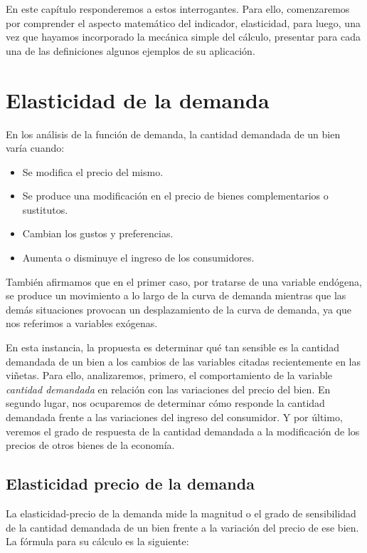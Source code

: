 \documentclass[12pt,a4paper]{article}
\begin{document}
En este capítulo responderemos a estos interrogantes. Para ello, comenzaremos por comprender el aspecto matemático del indicador, elasticidad, para luego, una vez que hayamos incorporado la mecánica simple del cálculo, presentar para cada una de las definiciones algunos ejemplos de su aplicación.

\section{Elasticidad de la demanda}

En los análisis de la función de demanda, la cantidad demandada de un bien varía cuando:

\begin{itemize}
    \item Se modifica el precio del mismo.
    \item Se produce una modificación en el precio de bienes complementarios o sustitutos.
    \item Cambian los gustos y preferencias.
    \item Aumenta o disminuye el ingreso de los consumidores.
\end{itemize}

También afirmamos que en el primer caso, por tratarse de una variable endógena, se produce un movimiento a lo largo de la curva de demanda mientras que las demás situaciones provocan un desplazamiento de la curva de demanda, ya que nos referimos a variables exógenas.

En esta instancia, la propuesta es determinar qué tan sensible es la cantidad demandada de un bien a los cambios de las variables citadas recientemente en las viñetas. Para ello, analizaremos, primero, el comportamiento de la variable \textit{cantidad demandada} en relación con las variaciones del precio del bien. En segundo lugar, nos ocuparemos de determinar cómo responde la cantidad demandada frente a las variaciones del ingreso del consumidor. Y por último, veremos el grado de respuesta de la cantidad demandada a la modificación de los precios de otros bienes de la economía.

\subsection{Elasticidad precio de la demanda}

La elasticidad-precio de la demanda mide la magnitud o el grado de sensibilidad de la cantidad demandada de un bien frente a la variación del precio de ese bien. La fórmula para su cálculo es la siguiente:
\end{document}
